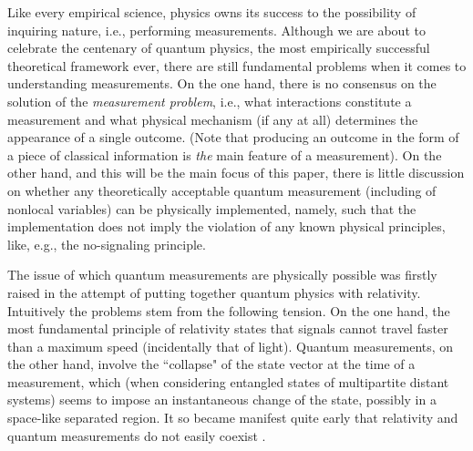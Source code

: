 \documentclass[12pt]{article}
\begin{document}
Like every empirical science, physics owns its success to the possibility of inquiring nature, i.e., performing measurements. Although we are about to celebrate the centenary of quantum physics, the most empirically successful theoretical framework ever, there are still fundamental problems when it comes to understanding measurements. On the one hand, there is no consensus on the solution of the \textit{measurement problem}, i.e., what interactions constitute a measurement and what physical mechanism (if any at all) determines the appearance of a single outcome. (Note that producing an outcome in the form of a piece of classical information is \textit{the} main feature of a measurement). On the other hand, and this will be the main focus of this paper, there is little discussion on whether any theoretically acceptable quantum measurement (including of nonlocal variables) can be physically implemented, namely, such that the implementation does not imply the violation of any known physical principles, like, e.g., the no-signaling principle. 

The issue of which quantum measurements are physically possible was firstly raised in the attempt of putting together quantum physics with relativity. Intuitively the problems stem from the following tension. On the one hand, the most fundamental principle of relativity states that signals cannot travel faster than a maximum speed (incidentally that of light). Quantum measurements, on the other hand, involve the  ``collapse" of the state vector at the time of a measurement, which (when considering entangled states of multipartite distant systems) seems to impose an instantaneous change of the state, possibly in a space-like separated region. It so became manifest quite early that relativity and quantum measurements do not easily coexist \cite{landau1931erweiterung, schilpp1949library, hellwig1970formal, aharonov1980states, aharonov1981can, guerreiro2012single}. 
\end{document}
